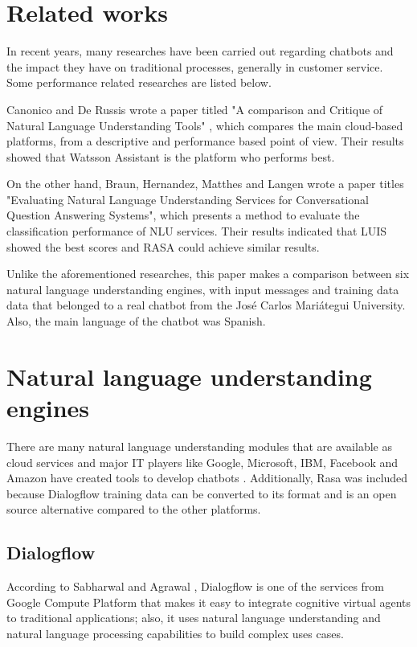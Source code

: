 \documentclass[conference, letterpaper]{IEEEtran}
\begin{document}
\section{Related works} \label{sec:relatedWorks}
In recent years, many researches have been carried out regarding chatbots and the impact they have on traditional processes, generally in customer service. Some performance related researches are listed below.

Canonico and De Russis wrote a paper titled "A comparison and Critique of Natural Language Understanding Tools" \cite{Canonico2018}, which compares the main cloud-based platforms, from a descriptive and performance based point of view. Their results showed that Watsson Assistant is the platform who performs best.

On the other hand, Braun, Hernandez, Matthes and Langen wrote a paper titles "Evaluating Natural Language Understanding Services for Conversational Question Answering Systems", which presents a method to evaluate the classification performance of NLU services. Their results indicated that LUIS showed the best scores and RASA could achieve similar results.

Unlike the aforementioned researches, this paper makes a comparison between six natural language understanding engines, with input messages and training data data that belonged to a real chatbot from the José Carlos Mariátegui University. Also, the main language of the chatbot was Spanish.


\section{Natural language understanding engines} \label{sec:nluServices}
There are many natural language understanding modules that are available as cloud services and major IT players like Google, Microsoft, IBM, Facebook and Amazon have created tools to develop chatbots \cite{hall2017hands}. Additionally, Rasa was included because Dialogflow training data can be converted to its format and is an open source alternative compared to the other platforms.
\subsection{Dialogflow}
According to Sabharwal and Agrawal \cite{Galitsky2019}, Dialogflow is one of the services from Google Compute Platform that makes it easy to integrate cognitive virtual agents to traditional applications; also, it uses natural language understanding and natural language processing capabilities to build complex uses cases.
\end{document}
